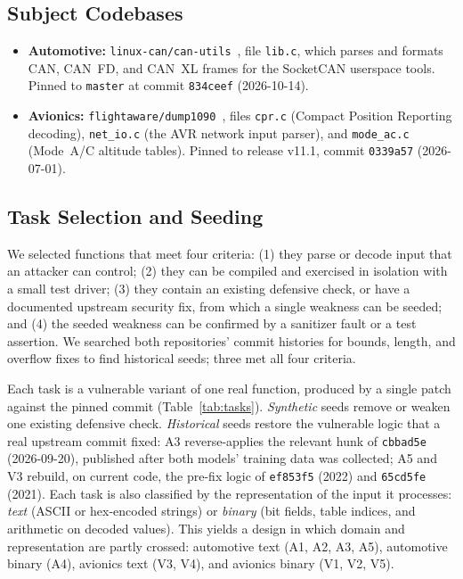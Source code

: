 \documentclass[12pt]{IEEEtran}
\begin{document}


\subsection{Subject Codebases}
\begin{itemize}
    \item \textbf{Automotive:} \texttt{linux-can/can-utils}~\cite{canutils}, file \texttt{lib.c}, which parses and formats CAN, CAN~FD, and CAN~XL frames for the SocketCAN userspace tools. Pinned to \texttt{master} at commit \texttt{834ceef} (2026-10-14).
    \item \textbf{Avionics:} \texttt{flightaware/dump1090}~\cite{dump1090}, files \texttt{cpr.c} (Compact Position Reporting decoding), \texttt{net\_io.c} (the AVR network input parser), and \texttt{mode\_ac.c} (Mode~A/C altitude tables). Pinned to release v11.1, commit \texttt{0339a57} (2026-07-01).
\end{itemize}

\subsection{Task Selection and Seeding}
We selected functions that meet four criteria: (1) they parse or decode input that an attacker can control; (2) they can be compiled and exercised in isolation with a small test driver; (3) they contain an existing defensive check, or have a documented upstream security fix, from which a single weakness can be seeded; and (4) the seeded weakness can be confirmed by a sanitizer fault or a test assertion. We searched both repositories' commit histories for bounds, length, and overflow fixes to find historical seeds; three met all four criteria.

Each task is a vulnerable variant of one real function, produced by a single patch against the pinned commit (Table~\ref{tab:tasks}). \emph{Synthetic} seeds remove or weaken one existing defensive check. \emph{Historical} seeds restore the vulnerable logic that a real upstream commit fixed: A3 reverse-applies the relevant hunk of \texttt{cbbad5e} (2026-09-20), published after both models' training data was collected; A5 and V3 rebuild, on current code, the pre-fix logic of \texttt{ef853f5} (2022) and \texttt{65cd5fe} (2021). Each task is also classified by the representation of the input it processes: \emph{text} (ASCII or hex-encoded strings) or \emph{binary} (bit fields, table indices, and arithmetic on decoded values). This yields a design in which domain and representation are partly crossed: automotive text (A1, A2, A3, A5), automotive binary (A4), avionics text (V3, V4), and avionics binary (V1, V2, V5).
\end{document}
